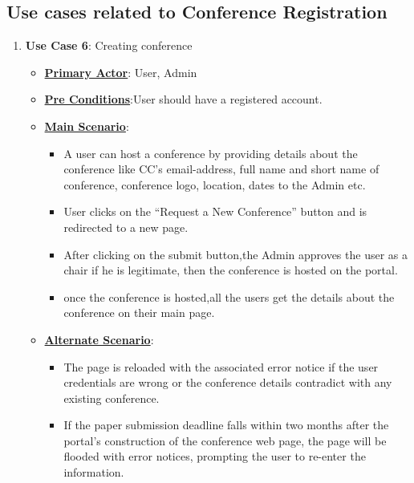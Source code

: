 \documentclass[english,a4paper,12pt]{report}
\begin{document}
\subsection{Use cases related to Conference Registration}
\begin{enumerate}
    \item \textbf{Use Case 6}: Creating conference
    \begin{itemize} 
        \item \underline{\textbf{Primary Actor}}: User, Admin
        \item \underline{\textbf{Pre Conditions}}:User should have a registered account.
        \item \underline{\textbf{Main Scenario}}:
        \begin{itemize}
        
        \item A user can host a conference by providing details about the conference like  CC's email-address, full name and short name of conference, conference logo, location, dates to the Admin etc.
        \item User clicks on the “Request a New Conference” button and is redirected to a new page.
        \item After clicking on the submit button,the Admin approves the user as a chair if he is legitimate, then the conference is hosted on the portal.
        \item once the conference is hosted,all the users get the details about the conference on their main page.
        
        \end{itemize}
         \item \underline{\textbf{Alternate Scenario}}:
        \begin{itemize}
        
        \item The page is reloaded with the associated error notice if the user credentials are wrong or the conference details contradict with any existing conference.
        \item If the paper submission deadline falls within two months after the portal's construction of the conference web page, the page will be flooded with error notices, prompting the user to re-enter the information.
        
        \end{itemize}
        
    \end{itemize}
    

\end{enumerate}
\end{document}
